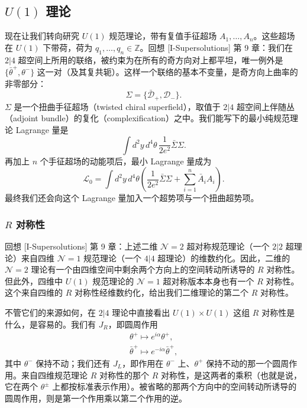 \subsection{$U(1)$ 理论}

现在让我们转向研究 $U(1)$ 规范理论，带有复值手征超场 $A_1,\dots,A_n$。这些超场在 $U(1)$ 下带荷，荷为 $q_1,\dots,q_n\in\mathbb{Z}$。回想 [I-Supersolutions] 第 9 章：我们在 $2|4$ 超空间上所用的联络，被约束为在所有的奇方向对上都平坦，唯一例外是 $\{\bar\theta^+,\theta^-\}$ 这一对（及其复共轭）。这样一个联络的基本不变量，是奇方向上曲率的非零部分：
\[
\Sigma=\{\bar{\mathcal{D}}_+,\mathcal{D}_-\}.
\]
$\Sigma$ 是一个扭曲手征超场（twisted chiral superfield），取值于 $2|4$ 超空间上伴随丛（adjoint bundle）的复化（complexification）之中。我们能写下的最小纯规范理论 Lagrange 量是
\[
\int d^2y\,d^4\theta\,\frac{1}{2e^2}\bar\Sigma\Sigma.
\]
再加上 $n$ 个手征超场的动能项后，最小 Lagrange 量成为
\begin{equation}
  \tag{13.1}
  \label{eq:13-1}
  \mathcal{L}_0=\int d^2y\,d^4\theta\left(\frac{1}{2e^2}\bar\Sigma\Sigma+\sum_{i=1}^{n}\bar A_iA_i\right).
\end{equation}
最终我们还会向这个 Lagrange 量加入一个超势项与一个扭曲超势项。

\subsubsection{$R$ 对称性}

回想 [I-Supersolutions] 第 9 章：上述二维 $\mathcal{N}=2$ 超对称规范理论（一个 $2|2$ 超理论）来自四维 $\mathcal{N}=1$ 规范理论（一个 $4|4$ 超理论）的维数约化。因此，二维的 $\mathcal{N}=2$ 理论有一个由四维空间中剩余两个方向上的空间转动所诱导的 $R$ 对称性。但此外，四维中 $U(1)$ 规范理论的 $\mathcal{N}=1$ 超对称版本本身也有一个 $R$ 对称性。这个来自四维的 $R$ 对称性经维数约化，给出我们二维理论的第二个 $R$ 对称性。

不管它们的来源如何，在 $2|4$ 理论中直接看出 $U(1)\times U(1)$ 这组 $R$ 对称性是什么，是容易的。我们有 $J_R$，即圆周作用
\[
\begin{gathered}
\theta^+\mapsto e^{i\alpha}\theta^+,\\
\bar\theta^+\mapsto e^{-i\alpha}\bar\theta^+,
\end{gathered}
\]
其中 $\theta^-$ 保持不动；我们还有 $J_L$，即作用在 $\theta^-$ 上、$\theta^+$ 保持不动的那一个圆周作用。来自四维规范理论 $R$ 对称性的那个 $R$ 对称性，是这两者的乘积（也就是说，它在两个 $\theta^\pm$ 上都按标准表示作用）。被省略的那两个方向中的空间转动所诱导的圆周作用，则是第一个作用乘以第二个作用的逆。

